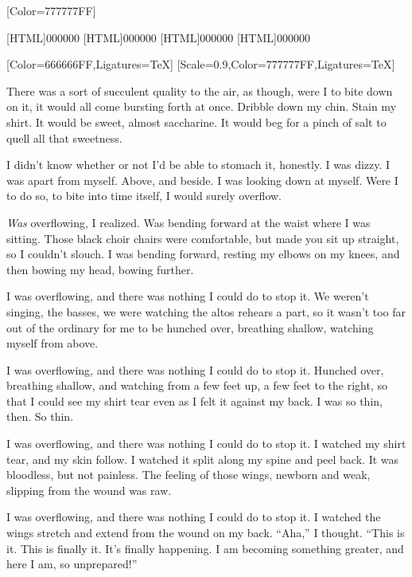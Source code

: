 
\renewfontfamily{}[Color=777777FF]

[HTML]{000000}
[HTML]{000000}
[HTML]{000000}
[HTML]{000000}
\begin{paracol}{2}
[Color=666666FF,Ligatures=TeX]
\renewfontfamily{}[Scale=0.9,Color=777777FF,Ligatures=TeX]
\begin{leftcolumn}
\noindent There was a sort of succulent quality to the air, as though, were I to bite down on it, it would all come bursting forth at once. Dribble down my chin. Stain my shirt. It would be sweet, almost saccharine. It would beg for a pinch of salt to quell all that sweetness.

I didn't know whether or not I'd be able to stomach it, honestly. I was dizzy. I was apart from myself. Above, and beside. I was looking down at myself. Were I to do so, to bite into time itself, I would surely overflow.

\emph{Was} overflowing, I realized. Was bending forward at the waist where I was sitting. Those black choir chairs were comfortable, but made you sit up straight, so I couldn't slouch. I was bending forward, resting my elbows on my knees, and then bowing my head, bowing further.

I was overflowing, and there was nothing I could do to stop it. We weren't singing, the basses, we were watching the altos rehears a part, so it wasn't too far out of the ordinary for me to be hunched over, breathing shallow, watching myself from above.

I was overflowing, and there was nothing I could do to stop it. Hunched over, breathing shallow, and watching from a few feet up, a few feet to the right, so that I could see my shirt tear even as I felt it against my back. I was so thin, then. So thin.

I was overflowing, and there was nothing I could do to stop it. I watched my shirt tear, and my skin follow. I watched it split along my spine and peel back. It was bloodless, but not painless. The feeling of those wings, newborn and weak, slipping from the wound was raw.

I was overflowing, and there was nothing I could do to stop it. I watched the wings stretch and extend from the wound on my back. ``Aha,'' I thought. ``This is it. This is finally it. It's finally happening. I am becoming something greater, and here I am, so unprepared!''


\end{leftcolumn}
\end{paracol}

